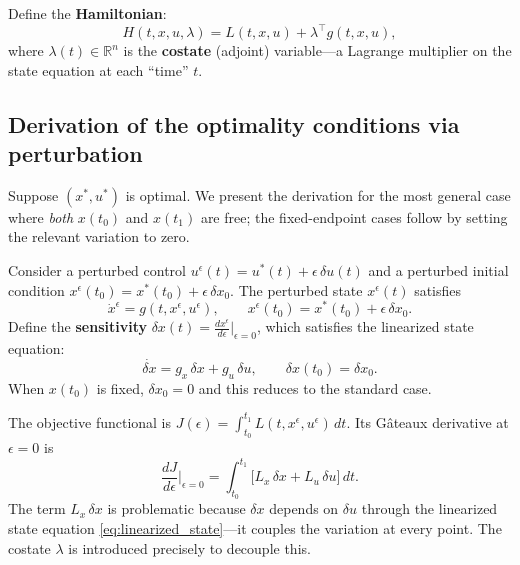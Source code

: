 \documentclass[12pt,a4paper]{article}
\theoremstyle{definition}
\theoremstyle{plain}
\theoremstyle{remark}
\newcommand{\R}{\mathbb{R}}
\begin{document}
Define the \textbf{Hamiltonian}:
\begin{equation}
\label{eq:abstract_H}
  H(t, x, u, \lambda) = L(t, x, u) + \lambda^\top g(t, x, u),
\end{equation}
where $\lambda(t) \in \R^n$ is the \textbf{costate} (adjoint) variable---a Lagrange multiplier on the state equation at each ``time'' $t$.

\subsection{Derivation of the optimality conditions via perturbation}

Suppose $(x^*, u^*)$ is optimal. We present the derivation for the most general case where \emph{both} $x(t_0)$ and $x(t_1)$ are free; the fixed-endpoint cases follow by setting the relevant variation to zero.

Consider a perturbed control $u^\epsilon(t) = u^*(t) + \epsilon\, \delta u(t)$ and a perturbed initial condition $x^\epsilon(t_0) = x^*(t_0) + \epsilon\,\delta x_0$. The perturbed state $x^\epsilon(t)$ satisfies
\[
  \dot{x}^\epsilon = g(t, x^\epsilon, u^\epsilon), \qquad x^\epsilon(t_0) = x^*(t_0) + \epsilon\,\delta x_0.
\]
Define the \textbf{sensitivity} $\delta x(t) = \frac{d x^\epsilon}{d\epsilon}\big|_{\epsilon=0}$, which satisfies the linearized state equation:
\begin{equation}
\label{eq:linearized_state}
  \dot{\delta x} = g_x\, \delta x + g_u\, \delta u, \qquad \delta x(t_0) = \delta x_0.
\end{equation}
When $x(t_0)$ is fixed, $\delta x_0 = 0$ and this reduces to the standard case.

The objective functional is $J(\epsilon) = \int_{t_0}^{t_1} L(t, x^\epsilon, u^\epsilon)\, dt$. Its Gâteaux derivative at $\epsilon = 0$ is
\begin{equation}
\label{eq:gateaux_J}
  \frac{dJ}{d\epsilon}\bigg|_{\epsilon=0} = \int_{t_0}^{t_1} \bigl[L_x\, \delta x + L_u\, \delta u\bigr]\, dt.
\end{equation}
The term $L_x\,\delta x$ is problematic because $\delta x$ depends on $\delta u$ through the linearized state equation \eqref{eq:linearized_state}---it couples the variation at every point. The costate $\lambda$ is introduced precisely to decouple this.
\end{document}
